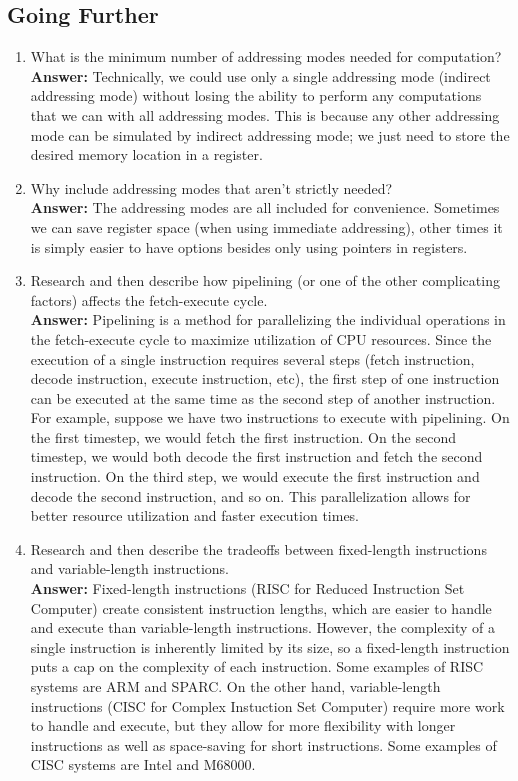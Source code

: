 \documentclass[12pt]{article}
\begin{document}
\subsection*{Going Further}
\begin{enumerate}
    \item What is the minimum number of addressing modes needed for computation? \\
	    \textbf{Answer:} Technically, we could use only a single addressing mode (indirect addressing mode) without losing the ability to perform any computations that we can with all addressing modes. This is because any other addressing mode can be simulated by indirect addressing mode; we just need to store the desired memory location in a register.
    \item Why include addressing modes that aren't strictly needed? \\
	    \textbf{Answer:} The addressing modes are all included for convenience. Sometimes we can save register space (when using immediate addressing), other times it is simply easier to have options besides only using pointers in registers.
    \item Research and then describe how pipelining (or one of the other complicating factors) affects the fetch-execute cycle. \\
	    \textbf{Answer:} Pipelining is a method for parallelizing the individual operations in the fetch-execute cycle to maximize utilization of CPU resources. Since the execution of a single instruction requires several steps (fetch instruction, decode instruction, execute instruction, etc), the first step of one instruction can be executed at the same time as the second step of another instruction. For example, suppose we have two instructions to execute with pipelining. On the first timestep, we would fetch the first instruction. On the second timestep, we would both decode the first instruction and fetch the second instruction. On the third step, we would execute the first instruction and decode the second instruction, and so on. This parallelization allows for better resource utilization and faster execution times.
    \item Research and then describe the tradeoffs between fixed-length instructions and variable-length instructions. \\
	    \textbf{Answer:} Fixed-length instructions (RISC for Reduced Instruction Set Computer) create consistent instruction lengths, which are easier to handle and execute than variable-length instructions. However, the complexity of a single instruction is inherently limited by its size, so a fixed-length instruction puts a cap on the complexity of each instruction. Some examples of RISC systems are ARM and SPARC. On the other hand, variable-length instructions (CISC for Complex Instuction Set Computer) require more work to handle and execute, but they allow for more flexibility with longer instructions as well as space-saving for short instructions. Some examples of CISC systems are Intel and M68000.
\end{enumerate}
\end{document}

